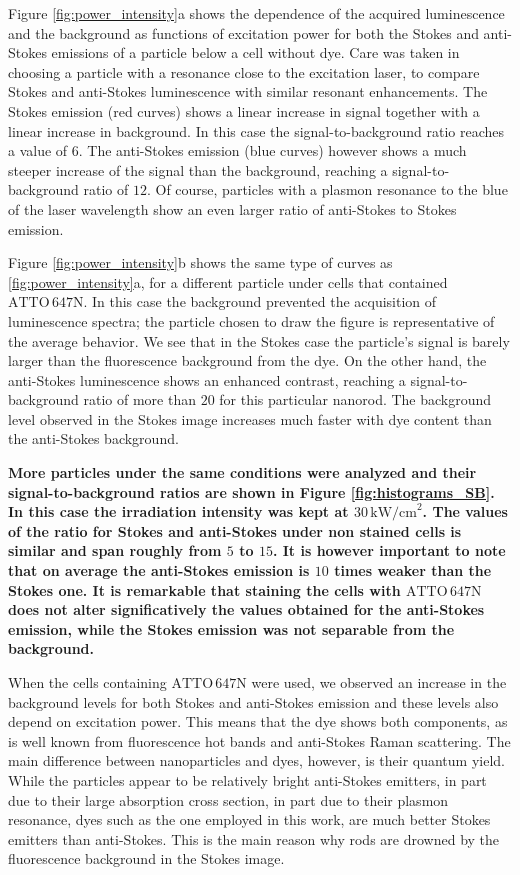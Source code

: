 \documentclass[journal=nalefd,manuscript=letter]{achemso}
\newcommand{\pwr}{\ensuremath{\,\textrm{kW/cm}^2}}
\newcommand{\atto}{\ensuremath{\textrm{ATTO}\,647\textrm{N}}}
\begin{document}
Figure \ref{fig:power_intensity}a shows the dependence of the acquired
luminescence and the background as functions of excitation power for both the
Stokes and anti-Stokes emissions of a particle below a cell without dye. Care
was taken in choosing a particle with a resonance close to the excitation laser,
to compare Stokes and anti-Stokes luminescence with similar resonant
enhancements. The Stokes emission (red curves) shows a linear increase in signal
together with a linear increase in background. In this case the
signal-to-background ratio reaches a value of $6$. The anti-Stokes emission
(blue curves) however shows a much steeper increase of the signal than the
background, reaching a signal-to-background ratio of $12$. Of course, particles
with a plasmon resonance to the blue of the laser wavelength show an even larger
ratio of anti-Stokes to Stokes emission.

Figure \ref{fig:power_intensity}b shows the same type of curves as
\ref{fig:power_intensity}a, for a different particle under cells that contained
$\atto$. In this case the background prevented the acquisition of luminescence
spectra; the particle chosen to draw the figure is representative of the average
behavior. We see that in the Stokes case the particle's signal is barely larger
than the fluorescence background from the dye. On the other hand, the
anti-Stokes luminescence shows an enhanced contrast, reaching a
signal-to-background ratio of more than $20$ for this particular nanorod. The
background level observed in the Stokes image increases much faster with dye
content than the anti-Stokes background. 

\textbf{More particles under the same conditions were analyzed and their
signal-to-background ratios are shown in Figure \ref{fig:histograms_SB}. In this
case the irradiation intensity was kept at $30\pwr$. The values of the ratio for
Stokes and anti-Stokes under non stained cells is similar and span roughly from
$5$ to $15$. It is however important to note that on average the anti-Stokes
emission is $10$ times weaker than the Stokes one. It is remarkable that
staining the cells with \atto does not alter significatively the values obtained
for the anti-Stokes emission, while the Stokes emission was not separable from
the background.}

When the cells containing $\atto$ were used, we observed an increase in the
background levels for both Stokes and anti-Stokes emission and these levels also
depend on excitation power. This means that the dye shows both
components, as is well known from fluorescence hot bands and anti-Stokes Raman
scattering. The main difference between nanoparticles and dyes, however, is
their quantum yield. While the particles appear to be relatively bright
anti-Stokes emitters, in part due to their large absorption cross section, in
part due to their plasmon resonance, dyes such as the one employed in this work,
are much better Stokes emitters than anti-Stokes. This is the main reason why
rods are drowned by the fluorescence background in the Stokes image.
\end{document}
